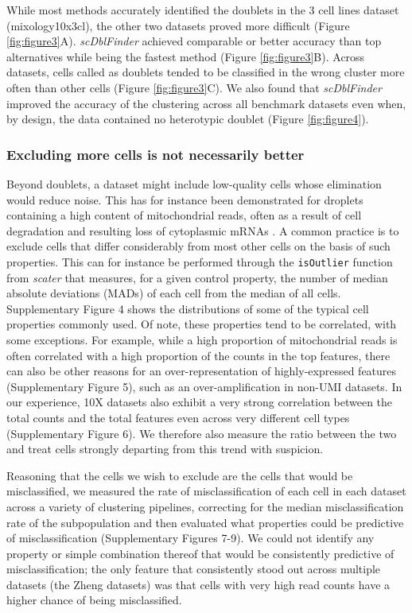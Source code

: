 \documentclass{bmcart}
\begin{document}
While most methods accurately identified the doublets in the 3 cell lines dataset (mixology10x3cl), the other two datasets proved more difficult (Figure \ref{fig:figure3}A). \textit{scDblFinder} achieved comparable or better accuracy than top alternatives while being the fastest method (Figure \ref{fig:figure3}B). Across datasets, cells called as doublets tended to be classified in the wrong cluster more often than other cells (Figure \ref{fig:figure3}C). We also found that \textit{scDblFinder} improved the accuracy of the clustering across all benchmark datasets even when, by design, the data contained no heterotypic doublet (Figure \ref{fig:figure4}).

\subsubsection*{Excluding more cells is not necessarily better}

Beyond doublets, a dataset might include low-quality cells whose elimination would reduce noise. This has for instance been demonstrated for droplets containing a high content of mitochondrial reads, often as a result of cell degradation and resulting loss of cytoplasmic mRNAs \cite{IlicicLowQual2016}. A common practice is to exclude cells that differ considerably from most other cells on the basis of such properties. This can for instance be performed through the \texttt{isOutlier} function from \textit{scater} that measures, for a given control property, the number of median absolute deviations (MADs) of each cell from the median of all cells. Supplementary Figure 4 shows the distributions of some of the typical cell properties commonly used. Of note, these properties tend to be correlated, with some exceptions. For example, while a high proportion of mitochondrial reads is often correlated with a high proportion of the counts in the top features, there can also be other reasons for an over-representation of highly-expressed features (Supplementary Figure 5), such as an over-amplification in non-UMI datasets. In our experience, 10X datasets also exhibit a very strong correlation between the total counts and the total features even across very different cell types (Supplementary Figure 6). We therefore also measure the ratio between the two and treat cells strongly departing from this trend with suspicion.

Reasoning that the cells we wish to exclude are the cells that would be misclassified, we measured the rate of misclassification of each cell in each dataset across a variety of clustering pipelines, correcting for the median misclassification rate of the subpopulation and then evaluated what properties could be predictive of misclassification (Supplementary Figures 7-9). We could not identify any property or simple combination thereof that would be consistently predictive of misclassification; the only feature that consistently stood out across multiple datasets (the Zheng datasets) was that cells with very high read counts have a higher chance of being misclassified.
\end{document}
